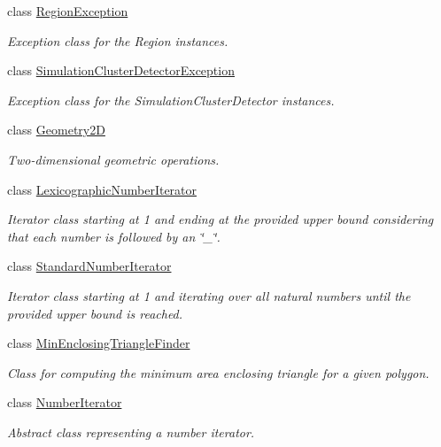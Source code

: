 \begin{DoxyCompactItemize}
class \hyperlink{classmultiscale_1_1RegionException}{Region\-Exception}
\begin{DoxyCompactList}\small\item\em Exception class for the Region instances. \end{DoxyCompactList}\item 
class \hyperlink{classmultiscale_1_1SimulationClusterDetectorException}{Simulation\-Cluster\-Detector\-Exception}
\begin{DoxyCompactList}\small\item\em Exception class for the Simulation\-Cluster\-Detector instances. \end{DoxyCompactList}\item 
class \hyperlink{classmultiscale_1_1Geometry2D}{Geometry2\-D}
\begin{DoxyCompactList}\small\item\em Two-\/dimensional geometric operations. \end{DoxyCompactList}\item 
class \hyperlink{classmultiscale_1_1LexicographicNumberIterator}{Lexicographic\-Number\-Iterator}
\begin{DoxyCompactList}\small\item\em Iterator class starting at 1 and ending at the provided upper bound considering that each number is followed by an \char`\"{}\-\_\-\char`\"{}. \end{DoxyCompactList}\item 
class \hyperlink{classmultiscale_1_1StandardNumberIterator}{Standard\-Number\-Iterator}
\begin{DoxyCompactList}\small\item\em Iterator class starting at 1 and iterating over all natural numbers until the provided upper bound is reached. \end{DoxyCompactList}\item 
class \hyperlink{classmultiscale_1_1MinEnclosingTriangleFinder}{Min\-Enclosing\-Triangle\-Finder}
\begin{DoxyCompactList}\small\item\em Class for computing the minimum area enclosing triangle for a given polygon. \end{DoxyCompactList}\item 
class \hyperlink{classmultiscale_1_1NumberIterator}{Number\-Iterator}
\begin{DoxyCompactList}\small\item\em Abstract class representing a number iterator. \end{DoxyCompactList}\item 

\end{DoxyCompactItemize}
